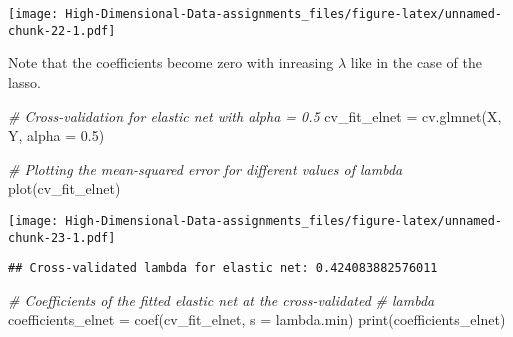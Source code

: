 \documentclass[
]{book}
\newenvironment{Shaded}{\begin{snugshade}}{\end{snugshade}}
\newcommand{\AttributeTok}[1]{\textcolor[rgb]{0.77,0.63,0.00}{#1}}
\newcommand{\CommentTok}[1]{\textcolor[rgb]{0.56,0.35,0.01}{\textit{#1}}}
\newcommand{\FloatTok}[1]{\textcolor[rgb]{0.00,0.00,0.81}{#1}}
\newcommand{\FunctionTok}[1]{\textcolor[rgb]{0.00,0.00,0.00}{#1}}
\newcommand{\NormalTok}[1]{#1}
\newcommand{\OtherTok}[1]{\textcolor[rgb]{0.56,0.35,0.01}{#1}}
\newcommand{\SpecialCharTok}[1]{\textcolor[rgb]{0.00,0.00,0.00}{#1}}
\newcommand{\StringTok}[1]{\textcolor[rgb]{0.31,0.60,0.02}{#1}}
\begin{document}
\texttt{[image: High-Dimensional-Data-assignments\_files/figure-latex/unnamed-chunk-22-1.pdf]}

Note that the coefficients become zero with inreasing \(\lambda\) like in the case of the lasso.

\begin{Shaded}
\begin{Highlighting}[]
\CommentTok{\# Cross{-}validation for elastic net with \textquotesingle{}alpha = 0.5\textquotesingle{}}
\NormalTok{cv\_fit\_elnet }\OtherTok{=} \FunctionTok{cv.glmnet}\NormalTok{(X, Y, }\AttributeTok{alpha =} \FloatTok{0.5}\NormalTok{)}

\CommentTok{\# Plotting the mean{-}squared error for different values of lambda}
\FunctionTok{plot}\NormalTok{(cv\_fit\_elnet)}
\end{Highlighting}
\end{Shaded}

\texttt{[image: High-Dimensional-Data-assignments\_files/figure-latex/unnamed-chunk-23-1.pdf]}

\begin{Shaded}
\end{Shaded}

\begin{verbatim}
## Cross-validated lambda for elastic net: 0.424083882576011
\end{verbatim}

\begin{Shaded}
\begin{Highlighting}[]
\CommentTok{\# Coefficients of the fitted elastic net at the cross{-}validated}
\CommentTok{\# lambda}
\NormalTok{coefficients\_elnet }\OtherTok{=} \FunctionTok{coef}\NormalTok{(cv\_fit\_elnet, }\AttributeTok{s =} \StringTok{\textquotesingle{}lambda.min\textquotesingle{}}\NormalTok{)}
\FunctionTok{print}\NormalTok{(coefficients\_elnet)}
\end{Highlighting}
\end{Shaded}
\end{document}
